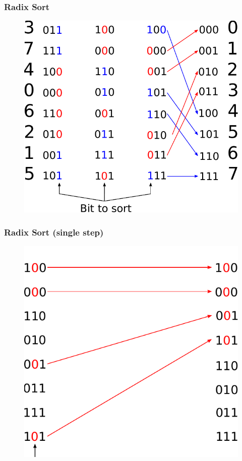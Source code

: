 \documentclass[aspectratio=169]{beamer}
\begin{document}
\frame
{
	\frametitle{Radix Sort}
	\begin{figure}
		\centering
		\includegraphics[height=0.7\textheight]{radix3}
	\end{figure}
}

\frame
{
	\frametitle{Radix Sort (single step)}
	\begin{figure}
		\centering
		\includegraphics[height=0.7\textheight]{radix4}
	\end{figure}
}
\end{document}
